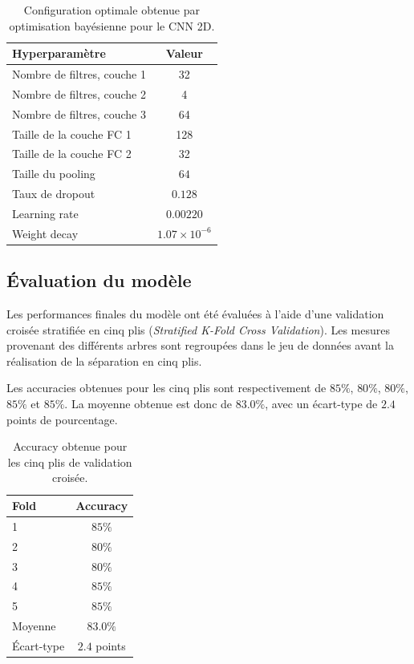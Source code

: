 \documentclass[12pt,a4paper,twoside]{article}
\begin{document}
\begin{table}[htbp]
    \centering
    \caption{Configuration optimale obtenue par optimisation bayésienne pour le CNN 2D.}
    \label{tab:best_config_2d}
    \begin{tabular}{lc}
        \toprule
        \textbf{Hyperparamètre} & \textbf{Valeur} \\
        \midrule
        Nombre de filtres, couche 1 & 32 \\
        Nombre de filtres, couche 2 & 4 \\
        Nombre de filtres, couche 3 & 64 \\
        Taille de la couche FC 1 & 128 \\
        Taille de la couche FC 2 & 32 \\
        Taille du pooling & $64$ \\
        Taux de dropout & $0.128$ \\
        Learning rate & $0.00220$ \\
        Weight decay & $1.07\times10^{-6}$ \\
        \bottomrule
    \end{tabular}
\end{table}

\subsection{Évaluation du modèle}
\label{subsec:evaluation_2d}

Les performances finales du modèle ont été évaluées à l'aide d'une validation croisée stratifiée en cinq plis (\textit{Stratified K-Fold Cross Validation}). Les mesures provenant des différents arbres sont regroupées dans le jeu de données avant la réalisation de la séparation en cinq plis.

Les accuracies obtenues pour les cinq plis sont respectivement de $85\%$, $80\%$, $80\%$, $85\%$ et $85\%$. La moyenne obtenue est donc de $83.0\%$, avec un écart-type de $2.4$ points de pourcentage.

\begin{table}[htbp]
    \centering
    \caption{Accuracy obtenue pour les cinq plis de validation croisée.}
    \label{tab:results_2d}
    \begin{tabular}{lc}
        \toprule
        \textbf{Fold} & \textbf{Accuracy} \\
        \midrule
        1 & $85\%$ \\
        2 & $80\%$ \\
        3 & $80\%$ \\
        4 & $85\%$ \\
        5 & $85\%$ \\
        \midrule
        Moyenne & $\mathbf{83.0\%}$ \\
        Écart-type & $\mathbf{2.4}$ points \\
        \bottomrule
    \end{tabular}
\end{table}
\end{document}
